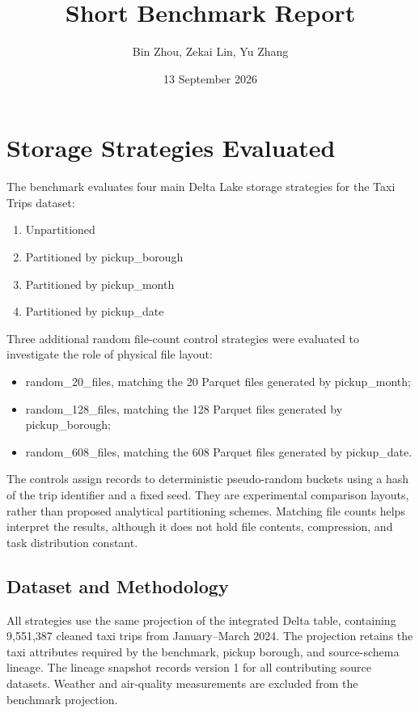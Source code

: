 \documentclass[a4paper,11pt]{article}
\title{Short Benchmark Report}
\author{Bin Zhou, Zekai Lin, Yu Zhang}
\date{13 September 2026}
\begin{document}
\maketitle

\section{Storage Strategies Evaluated}

The benchmark evaluates four main Delta Lake storage strategies for the Taxi Trips dataset:

\begin{enumerate}
    \item Unpartitioned
    \item Partitioned by pickup\_borough
    \item Partitioned by pickup\_month
    \item Partitioned by pickup\_date
\end{enumerate}

Three additional random file-count control strategies were evaluated to investigate the role of physical file layout:

\begin{itemize}
    \item random\_20\_files, matching the 20 Parquet files generated by pickup\_month;
    \item random\_128\_files, matching the 128 Parquet files generated by pickup\_borough;
    \item random\_608\_files, matching the 608 Parquet files generated by pickup\_date.
\end{itemize}

The controls assign records to deterministic pseudo-random buckets using a hash of the trip identifier and a fixed seed. They are experimental comparison layouts, rather than proposed analytical partitioning schemes. Matching file counts helps interpret the results, although it does not hold file contents, compression, and task distribution constant.

\subsection*{Dataset and Methodology}

All strategies use the same projection of the integrated Delta table, containing 9,551,387 cleaned taxi trips from January--March 2024. The projection retains the taxi attributes required by the benchmark, pickup borough, and source-schema lineage. The lineage snapshot records version 1 for all contributing source datasets. Weather and air-quality measurements are excluded from the benchmark projection.
\end{document}
